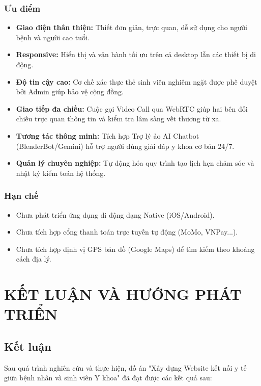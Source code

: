 \documentclass[a4paper,13pt]{extreport}
\begin{document}
\subsection{Ưu điểm}
\begin{itemize}
    \item \textbf{Giao diện thân thiện:} Thiết đơn giản, trực quan, dễ sử dụng cho người bệnh và người cao tuổi.
    \item \textbf{Responsive:} Hiển thị và vận hành tối ưu trên cả desktop lẫn các thiết bị di động.
    \item \textbf{Độ tin cậy cao:} Cơ chế xác thực thẻ sinh viên nghiêm ngặt được phê duyệt bởi Admin giúp bảo vệ cộng đồng.
    \item \textbf{Giao tiếp đa chiều:} Cuộc gọi Video Call qua WebRTC giúp hai bên đối chiếu trực quan thông tin và kiểm tra lâm sàng vết thương từ xa.
    \item \textbf{Tương tác thông minh:} Tích hợp Trợ lý ảo AI Chatbot (BlenderBot/Gemini) hỗ trợ người dùng giải đáp y khoa cơ bản 24/7.
    \item \textbf{Quản lý chuyên nghiệp:} Tự động hóa quy trình tạo lịch hẹn chăm sóc và nhật ký kiểm toán hệ thống.
\end{itemize}

\subsection{Hạn chế}
\begin{itemize}
    \item Chưa phát triển ứng dụng di động dạng Native (iOS/Android).
    \item Chưa tích hợp cổng thanh toán trực tuyến tự động (MoMo, VNPay...).
    \item Chưa tích hợp định vị GPS bản đồ (Google Maps) để tìm kiếm theo khoảng cách địa lý.
\end{itemize}

\chapter{KẾT LUẬN VÀ HƯỚNG PHÁT TRIỂN}

\section{Kết luận}

Sau quá trình nghiên cứu và thực hiện, đồ án "Xây dựng Website kết nối y tế giữa bệnh nhân và sinh viên Y khoa" đã đạt được các kết quả sau:
\end{document}
